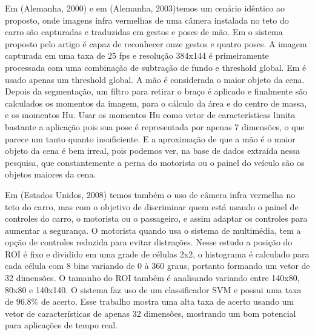 Em \cite{ref2} (Alemanha, 2000) e em \cite{ref1} (Alemanha, 2003)temos um cenário idêntico ao proposto, onde imagens infra vermelhas de uma câmera instalada no teto do carro são capturadas e traduzidas em gestos e poses de mão. Em \cite{ref1} o sistema proposto pelo artigo é capaz de reconhecer onze gestos e quatro poses. A imagem capturada em uma taxa de 25 fps e resolução 384x144 é primeiramente processada com uma combinação de subtração de fundo e threshold global. Em \cite{ref2} é usado apenas um threshold global. A mão é considerada o maior objeto da cena. Depois da segmentação, um filtro para retirar o braço é aplicado e finalmente são calculados os momentos da imagem, para o cálculo da área e do centro de massa, e os momentos Hu. Usar os momentos Hu como vetor de características limita bastante a aplicação pois sua pose é representada por apenas 7 dimensões, o que parece um tanto quanto insuficiente. E a aproximação de que a mão é o maior objeto da cena é bem irreal, pois podemos ver, na base de dados extraída nessa pesquisa, que constantemente a perna do motorista ou o painel do veículo são os objetos maiores da cena.


Em \cite{ref5} (Estados Unidos, 2008) temos também o uso de câmera infra vermelha no teto do carro, mas com o objetivo de discriminar quem está usando o painel de controles do carro, o motorista ou o passageiro, e assim adaptar os controles para aumentar a segurança. O motorista quando usa o sistema de multimédia, tem a opção de controles reduzida para evitar distrações. Nesse estudo a posição do ROI é fixo e dividido em uma grade de células 2x2, o histograma é calculado para cada célula com 8 bins variando de 0 à 360 graus, portanto formando um vetor de 32 dimensões. O tamanho do ROI também é analisando variando entre 140x80, 80x80 e 140x140. O sistema faz uso de um classificador SVM e possui uma taxa de 96.8\% de acerto. Esse trabalho mostra uma alta taxa de acerto usando um vetor de características de apenas 32 dimensões, mostrando um bom potencial para aplicações de tempo real.

